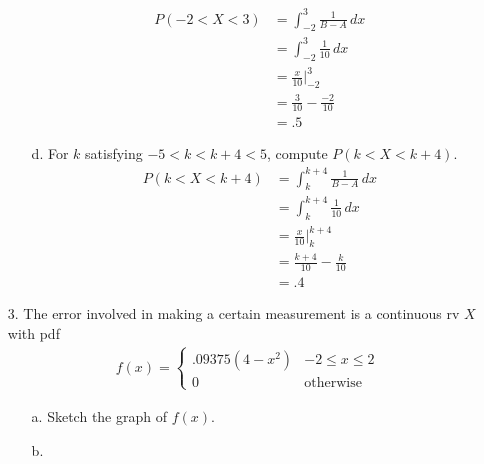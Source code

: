 \documentclass[letterpaper,12pt]{article}
\begin{document}
\begin{enumerate}
\begin{enumerate}
        \begin{align*}
          P(-2 < X < 3) &= \int_{-2}^{3} \frac{1}{B - A}\,dx \\
          &= \int_{-2}^{3} \frac{1}{10}\,dx \\
          &= \frac{x}{10}\bigg\rvert_{-2}^{3} \\
          &= \frac{3}{10} - \frac{-2}{10} \\
          &= .5
        \end{align*}
      \item[d.]
        For $k$ satisfying $-5 < k < k + 4 < 5$, compute $P(k < X < k + 4)$.
        \begin{align*}
          P(k < X < k + 4) &= \int_{k}^{k + 4} \frac{1}{B - A}\,dx \\
          &= \int_{k}^{k + 4} \frac{1}{10}\,dx \\
          &= \frac{x}{10}\bigg\rvert_{k}^{k + 4} \\
          &= \frac{k + 4}{10} - \frac{k}{10} \\
          &= .4
        \end{align*}
    \end{enumerate}
  \item[3.]
    The error involved in making a certain measurement is a continuous rv $X$ with pdf
    \begin{align*}
      f(x) = \begin{cases}
        .09375(4 - x^2) & -2 \le x \le 2 \\
        0               & \text{otherwise}
      \end{cases}
    \end{align*}
    \begin{enumerate}
      \item[a.]
        Sketch the graph of $f(x)$.
        \begin{center}
        \end{center}
      \item[b.]

\end{enumerate}
\end{enumerate}
\end{document}

